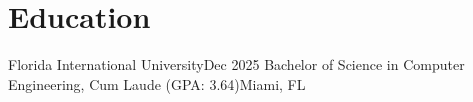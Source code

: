 \section{Education}
\resumeSubHeadingListStart

\resumeSubheading
{Florida International University}{Dec 2025}
{Bachelor of Science in Computer Engineering, Cum Laude (GPA: 3.64)}{Miami, FL}

\resumeItemListStart
{}
\resumeItemListEnd

\resumeSubHeadingListEnd